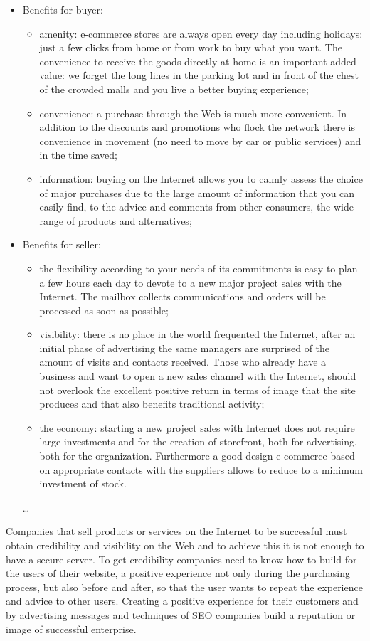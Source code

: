 \begin{itemize}
  \item Benefits for buyer:
  \begin{itemize}
    \item amenity: e-commerce stores are always open every day including holidays: just a few clicks from home or from work to buy what you want. The convenience to receive the goods directly at home is an important added value: we forget the long lines in the parking lot and in front of the chest of the crowded malls and you live a better buying experience;
    \item convenience: a purchase through the Web is much more convenient. In addition to the discounts and promotions who flock the network there is convenience in movement (no need to move by car or public services) and in the time saved;
    \item information: buying on the Internet allows you to calmly assess the choice of major purchases due to the large amount of information that you can easily find, to the advice and comments from other consumers, the wide range of products and alternatives;
  \end{itemize}
  \item Benefits for seller:
    \begin{itemize}
    \item the flexibility according to your needs of its commitments is easy to plan a few hours each day to devote to a new major project sales with the Internet. The mailbox collects communications and orders will be processed as soon as possible;
    \item visibility: there is no place in the world frequented the Internet, after an initial phase of advertising the same managers are surprised of the amount of visits and contacts received. Those who already have a business and want to open a new sales channel with the Internet, should not overlook the excellent positive return in terms of image that the site produces and that also benefits traditional activity;
    \item the economy: starting a new project sales with Internet does not require large investments and for the creation of storefront, both for advertising, both for the organization. Furthermore a good design e-commerce based on appropriate contacts with the suppliers allows to reduce to a minimum investment of stock.
  \end{itemize}\ldots
\end{itemize}
Companies that sell products or services on the Internet to be successful must obtain credibility and visibility on the Web and to achieve this it is not enough to have a secure server. To get credibility companies need to know how to build for the users of their website, a positive experience not only during the purchasing process, but also before and after, so that the user wants to repeat the experience and advice to other users. Creating a positive experience for their customers and by advertising messages and techniques of SEO companies build a reputation or image of successful enterprise.

